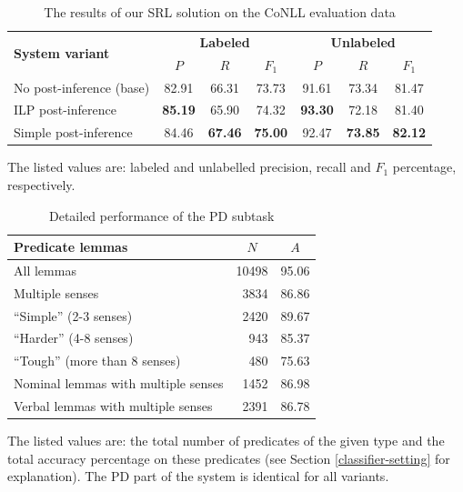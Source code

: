 \documentclass[12pt,notitlepage,a4paper]{report}
\begin{document}
\begin{table}[htb]\footnotesize
\caption{The results of our SRL solution on the CoNLL evaluation data}\label{tab:results}
\begin{center}
\begin{tabular}{|l|ccc|ccc|}\hline
\multirow{2}{*}{\bf System variant} & \multicolumn{3}{c|}{\bf Labeled} & \multicolumn{3}{c|}{\bf Unlabeled} \\
  & $P$ & $R$ & $F_1$ & $P$ & $R$ & $F_1$ \\\hline
No post-inference (base) & 82.91 & 66.31 & 73.73 & 91.61 & 73.34 & 81.47 \\
ILP post-inference & \bf 85.19 & 65.90 & 74.32 & \bf 93.30 & 72.18 & 81.40 \\
Simple post-inference & 84.46 & \bf 67.46 & \bf 75.00 & 92.47 & \bf 73.85 & \bf 82.12 \\\hline
\end{tabular}
\end{center}
The listed values are: labeled and unlabelled precision, recall and $F_1$ percentage, respectively.
\end{table}

\begin{table}[htb]\footnotesize
\caption{Detailed performance of the PD subtask}\label{tab:pd-output}
\begin{center}
\begin{tabular}{|l|r|c|}\hline
\bf Predicate lemmas & \multicolumn{1}{c|}{$N$} & $A$ \\\hline
All lemmas & 10498 & 95.06 \\
Multiple senses & 3834 & 86.86 \\
``Simple'' (2-3 senses) & 2420 & 89.67 \\
``Harder'' (4-8 senses) & 943 & 85.37 \\
``Tough'' (more than 8 senses) & 480 & 75.63 \\\hline
Nominal lemmas with multiple senses & 1452 & 86.98 \\
Verbal lemmas with multiple senses & 2391 & 86.78 \\\hline
\end{tabular}
\end{center}
The listed values are: the total number of predicates of the given type and the total accuracy percentage on these predicates (see Section \ref{classifier-setting} for explanation). The PD part of the system is identical for all variants.
\end{table}
\end{document}
